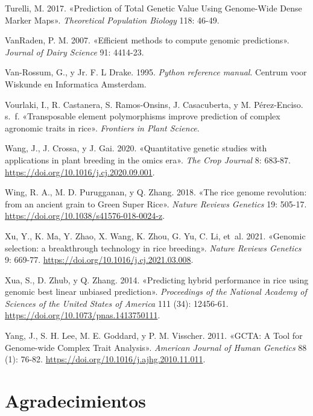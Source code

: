 \documentclass[11pt,spanish,a4paper,oneside,]{book} %
\begin{document}
\leavevmode\hypertarget{ref-cite:9}{}%
Turelli, M. 2017. «Prediction of Total Genetic Value Using Genome-Wide Dense Marker Maps». \emph{Theoretical Population Biology} 118: 46-49.

\leavevmode\hypertarget{ref-cite:39}{}%
VanRaden, P. M. 2007. «Efficient methods to compute genomic predictions». \emph{Journal of Dairy Science} 91: 4414-23.

\leavevmode\hypertarget{ref-cite:53}{}%
Van-Rossum, G., y Jr. F. L Drake. 1995. \emph{Python reference manual}. Centrum voor Wiskunde en Informatica Amsterdam.

\leavevmode\hypertarget{ref-cite:26}{}%
Vourlaki, I., R. Castanera, S. Ramos-Onsins, J. Casacuberta, y M. Pérez-Enciso. s.~f. «Transposable element polymorphisms improve prediction of complex agronomic traits in rice». \emph{Frontiers in Plant Science}.

\leavevmode\hypertarget{ref-cite:46}{}%
Wang, J., J. Crossa, y J. Gai. 2020. «Quantitative genetic studies with applications in plant breeding in the omics era». \emph{The Crop Journal} 8: 683-87. \url{https://doi.org/10.1016/j.cj.2020.09.001}.

\leavevmode\hypertarget{ref-cite:55}{}%
Wing, R. A., M. D. Purugganan, y Q. Zhang. 2018. «The rice genome revolution: from an ancient grain to Green Super Rice». \emph{Nature Reviews Genetics} 19: 505-17. \url{https://doi.org/10.1038/s41576-018-0024-z}.

\leavevmode\hypertarget{ref-cite:60}{}%
Xu, Y., K. Ma, Y. Zhao, X. Wang, K. Zhou, G. Yu, C. Li, et~al. 2021. «Genomic selection: a breakthrough technology in rice breeding». \emph{Nature Reviews Genetics} 9: 669-77. \url{https://doi.org/10.1016/j.cj.2021.03.008}.

\leavevmode\hypertarget{ref-cite:25}{}%
Xua, S., D. Zhub, y Q. Zhang. 2014. «Predicting hybrid performance in rice using genomic best linear unbiased prediction». \emph{Proceedings of the National Academy of Sciences of the United States of America} 111 (34): 12456-61. \url{https://doi.org/10.1073/pnas.1413750111}.

\leavevmode\hypertarget{ref-cite:54}{}%
Yang, J., S. H. Lee, M. E. Goddard, y P. M. Visscher. 2011. «GCTA: A Tool for Genome-wide Complex Trait Analysis». \emph{American Journal of Human Genetics} 88 (1): 76-82. \url{https://doi.org/10.1016/j.ajhg.2010.11.011}.

\endgroup

\hypertarget{agradecimientos}{%
\chapter*{Agradecimientos}\label{agradecimientos}}
\end{document}
